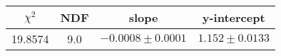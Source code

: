 \begin{tabular}{|c|c|c|c|}

\hline
$\chi^{2}$ & NDF & slope & y-intercept  \\
\hline
19.8574 & 9.0 & $-0.0008\pm0.0001$ & $1.152\pm0.0133$ \\
\hline

\end{tabular}